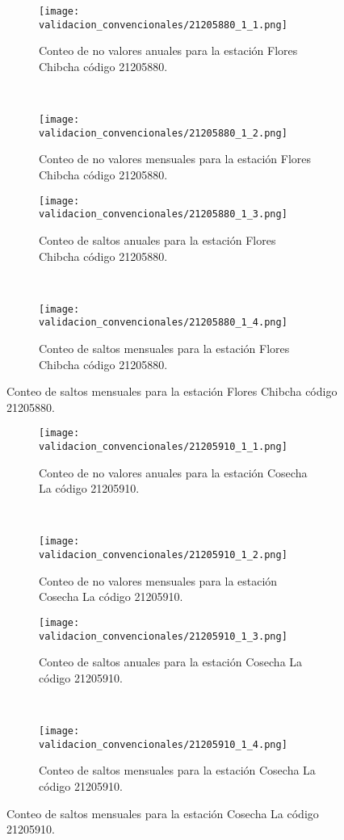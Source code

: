 \begin{figure}[H]\ContinuedFloat
\centering
	\begin{subfigure}[normla]{0.4\textwidth}
	\texttt{[image: validacion\_convencionales/21205880\_1\_1.png]}
		\caption{Conteo de no valores anuales para la estación Flores Chibcha código 21205880.}
		\label{subfig:a1}
		\end{subfigure}
		~
    \begin{subfigure}[normla]{0.4\textwidth}
	\texttt{[image: validacion\_convencionales/21205880\_1\_2.png]}
		\caption{Conteo de no valores mensuales para la estación Flores Chibcha código 21205880.}
		\label{subfig:a2}
		\end{subfigure}
		
    \begin{subfigure}[normla]{0.4\textwidth}
	\texttt{[image: validacion\_convencionales/21205880\_1\_3.png]}
		\caption{Conteo de saltos anuales para la estación Flores Chibcha código 21205880.}
		\label{subfig:a1}
		\end{subfigure}
		~
    \begin{subfigure}[normla]{0.4\textwidth}
	\texttt{[image: validacion\_convencionales/21205880\_1\_4.png]}
		\caption{Conteo de saltos mensuales para la estación Flores Chibcha código 21205880.}
		\label{subfig:a2}
		\end{subfigure}

	
\end{figure}
           
\begin{figure}[H]\ContinuedFloat
\centering
	\begin{subfigure}[normla]{0.4\textwidth}
	\texttt{[image: validacion\_convencionales/21205910\_1\_1.png]}
		\caption{Conteo de no valores anuales para la estación Cosecha La código 21205910.}
		\label{subfig:a1}
		\end{subfigure}
		~
    \begin{subfigure}[normla]{0.4\textwidth}
	\texttt{[image: validacion\_convencionales/21205910\_1\_2.png]}
		\caption{Conteo de no valores mensuales para la estación Cosecha La código 21205910.}
		\label{subfig:a2}
		\end{subfigure}
		
    \begin{subfigure}[normla]{0.4\textwidth}
	\texttt{[image: validacion\_convencionales/21205910\_1\_3.png]}
		\caption{Conteo de saltos anuales para la estación Cosecha La código 21205910.}
		\label{subfig:a1}
		\end{subfigure}
		~
    \begin{subfigure}[normla]{0.4\textwidth}
	\texttt{[image: validacion\_convencionales/21205910\_1\_4.png]}
		\caption{Conteo de saltos mensuales para la estación Cosecha La código 21205910.}
		\label{subfig:a2}
		\end{subfigure}

	
\end{figure}
           
